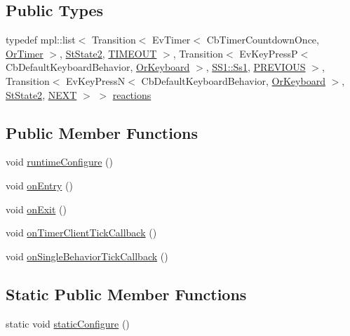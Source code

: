 \subsection*{Public Types}
\begin{DoxyCompactItemize}
\item 
typedef mpl\+::list$<$ Transition$<$ Ev\+Timer$<$ Cb\+Timer\+Countdown\+Once, \hyperlink{classsm__starcraft__ai_1_1OrTimer}{Or\+Timer} $>$, \hyperlink{structsm__starcraft__ai_1_1StState2}{St\+State2}, \hyperlink{structsm__starcraft__ai_1_1StState1_1_1TIMEOUT}{T\+I\+M\+E\+O\+UT} $>$, Transition$<$ Ev\+Key\+PressP$<$ Cb\+Default\+Keyboard\+Behavior, \hyperlink{classsm__starcraft__ai_1_1OrKeyboard}{Or\+Keyboard} $>$, \hyperlink{structsm__starcraft__ai_1_1SS1_1_1Ss1}{S\+S1\+::\+Ss1}, \hyperlink{structsm__starcraft__ai_1_1StState1_1_1PREVIOUS}{P\+R\+E\+V\+I\+O\+US} $>$, Transition$<$ Ev\+Key\+PressN$<$ Cb\+Default\+Keyboard\+Behavior, \hyperlink{classsm__starcraft__ai_1_1OrKeyboard}{Or\+Keyboard} $>$, \hyperlink{structsm__starcraft__ai_1_1StState2}{St\+State2}, \hyperlink{structsm__starcraft__ai_1_1StState1_1_1NEXT}{N\+E\+XT} $>$ $>$ \hyperlink{structsm__starcraft__ai_1_1StState1_ab34cfcd0ddcb1cff9ed1e73287ba613f}{reactions}
\end{DoxyCompactItemize}
\subsection*{Public Member Functions}
\begin{DoxyCompactItemize}
\item 
void \hyperlink{structsm__starcraft__ai_1_1StState1_a9086ab382edf7d0c6fa2ea2a6b86c99c}{runtime\+Configure} ()
\item 
void \hyperlink{structsm__starcraft__ai_1_1StState1_a985c3ef284839908cbae9cd8fd1f137a}{on\+Entry} ()
\item 
void \hyperlink{structsm__starcraft__ai_1_1StState1_a578ccb9a58ed0c5aa9c23c5011a53072}{on\+Exit} ()
\item 
void \hyperlink{structsm__starcraft__ai_1_1StState1_a837a15fbd435c8c6267f823eaa5a2df3}{on\+Timer\+Client\+Tick\+Callback} ()
\item 
void \hyperlink{structsm__starcraft__ai_1_1StState1_a0f2d099e87c1cce7df20d1c20669077a}{on\+Single\+Behavior\+Tick\+Callback} ()
\end{DoxyCompactItemize}
\subsection*{Static Public Member Functions}
\begin{DoxyCompactItemize}
\item 
static void \hyperlink{structsm__starcraft__ai_1_1StState1_ae07318885895f23f4bd4003e121b910d}{static\+Configure} ()
\end{DoxyCompactItemize}
